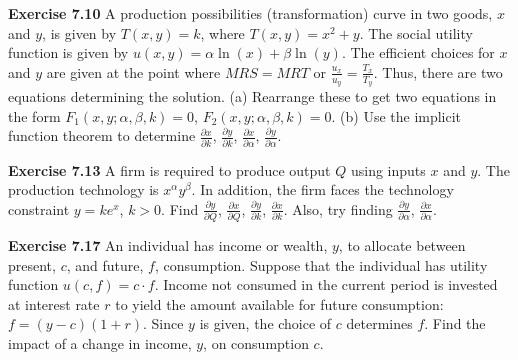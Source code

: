 \begin{original}
\textbf{Exercise 7.10} A production possibilities (transformation) curve in two goods, $x$ and $y$, is given by $T(x, y) = k$, where $T(x, y) = x^2 + y$. The social utility function is given by $u(x, y) = \alpha \ln(x) + \beta \ln(y)$. The efficient choices for $x$ and $y$ are given at the point where $MRS = MRT$ or $\frac{u_x}{u_y} = \frac{T_x}{T_y}$. Thus, there are two equations determining the solution. (a) Rearrange these to get two equations in the form $F_1(x, y; \alpha, \beta, k) = 0$, $F_2(x, y; \alpha, \beta, k) = 0$. (b) Use the implicit function theorem to determine $\frac{\partial x}{\partial k}$, $\frac{\partial y}{\partial k}$, $\frac{\partial x}{\partial \alpha}$, $\frac{\partial y}{\partial \alpha}$.

\textbf{Exercise 7.13} A firm is required to produce output $Q$ using inputs $x$ and $y$. The production technology is $x^\alpha y^\beta$. In addition, the firm faces the technology constraint $y = k e^x$, $k > 0$. Find $\frac{\partial y}{\partial Q}$, $\frac{\partial x}{\partial Q}$, $\frac{\partial y}{\partial k}$, $\frac{\partial x}{\partial k}$. Also, try finding $\frac{\partial y}{\partial \alpha}$, $\frac{\partial x}{\partial \alpha}$.

\textbf{Exercise 7.17} An individual has income or wealth, $y$, to allocate between present, $c$, and future, $f$, consumption. Suppose that the individual has utility function $u(c, f) = c \cdot f$. Income not consumed in the current period is invested at interest rate $r$ to yield the amount available for future consumption: $f = (y - c)(1 + r)$. Since $y$ is given, the choice of $c$ determines $f$. Find the impact of a change in income, $y$, on consumption $c$.
\end{original}
